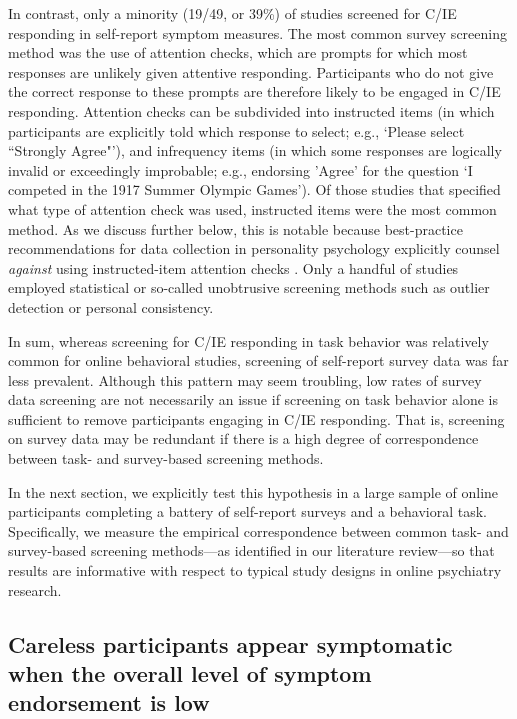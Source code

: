 \documentclass[a4paper,notitlepage,12pt]{article}
\begin{document}
\begin{refsection}[main]
In contrast, only a minority (19/49, or 39\%) of studies screened for C/IE responding in self-report symptom measures. The most common survey screening method was the use of attention checks, which are prompts for which most responses are unlikely given attentive responding. Participants who do not give the correct response to these prompts are therefore likely to be engaged in C/IE responding. Attention checks can be subdivided into instructed items (in which participants are explicitly told which response to select; e.g., `Please select ``Strongly Agree"'), and infrequency items (in which some responses are logically invalid or exceedingly improbable; e.g., endorsing 'Agree' for the question `I competed in the 1917 Summer Olympic Games'). Of those studies that specified what type of attention check was used, instructed items were the most common method. As we discuss further below, this is notable because best-practice recommendations for data collection in personality psychology explicitly counsel \emph{against} using instructed-item attention checks \cite{barends2019noncompliant, thomas2017validity, hauser2016attentive}. Only a handful of studies employed statistical or so-called unobtrusive screening methods such as outlier detection or personal consistency. 

In sum, whereas screening for C/IE responding in task behavior was relatively common for online behavioral studies, screening of self-report survey data was far less prevalent. Although this pattern may seem troubling, low rates of survey data screening are not necessarily an issue if screening on task behavior alone is sufficient to remove participants engaging in C/IE responding. That is, screening on survey data may be redundant if there is a high degree of correspondence between task- and survey-based screening methods. 

In the next section, we explicitly test this hypothesis in a large sample of online participants completing a battery of self-report surveys and a behavioral task. Specifically, we measure the empirical correspondence between common task- and survey-based screening methods---as identified in our literature review---so that results are informative with respect to typical study designs in online psychiatry research.

\subsection*{Careless participants appear symptomatic when the overall level of symptom endorsement is low}


\end{refsection}
\end{document}
